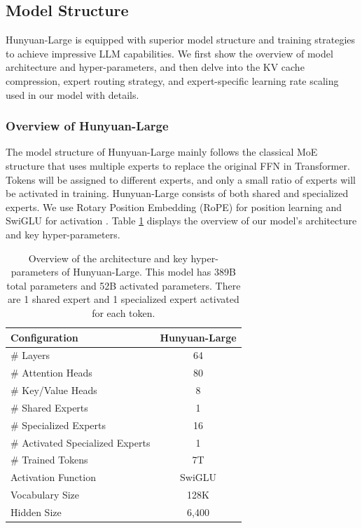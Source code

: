 \documentclass{article}
\begin{document}
\subsection{Model Structure}
Hunyuan-Large is equipped with superior model structure and training strategies to achieve impressive LLM capabilities. We first show the overview of model architecture and hyper-parameters, and then delve into the KV cache compression, expert routing strategy, and expert-specific learning rate scaling used in our model with details.

\subsubsection{Overview of Hunyuan-Large}
The model structure of Hunyuan-Large mainly follows the classical MoE structure that uses multiple experts to replace the original FFN in Transformer. Tokens will be assigned to different experts, and only a small ratio of experts will be activated in training. Hunyuan-Large consists of both shared and specialized experts. We use Rotary Position Embedding (RoPE) for position learning \citep{su2024roformer} and SwiGLU for activation \citep{shazeer2020glu}.
Table \ref{tab:overall_para} displays the overview of our model's architecture and key hyper-parameters.

\begin{table}[!hbtp]
    \centering
    \caption{Overview of the architecture and key hyper-parameters of Hunyuan-Large. This model has 389B total parameters and 52B activated parameters. There are 1 shared expert and 1 specialized expert activated for each token.}
        \begin{tabular}{l|c}
            \toprule
            \textbf{Configuration} & \textbf{Hunyuan-Large} \\
            \midrule
            \# Layers & 64\\
            \# Attention Heads & 80\\
            \# Key/Value Heads & 8\\
            \# Shared Experts & 1\\
            \# Specialized Experts & 16\\
            \# Activated Specialized Experts & 1\\
            \# Trained Tokens & 7T\\
            Activation Function & SwiGLU\\
            Vocabulary Size & 128K\\
            Hidden Size & 6,400\\
            \bottomrule
        \end{tabular}

    \label{tab:overall_para}
\end{table}
\end{document}
